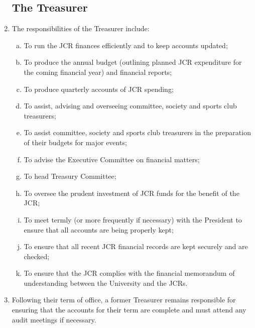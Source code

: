 \documentclass[12pt]{article}  %
\begin{document}
\begin{enumerate}
	\subsection{The Treasurer}
	\item The responsibilities of the Treasurer include:
	\begin{enumerate}[(a)]
		\item To run the JCR finances efficiently and to keep accounts updated;
		\item To produce the annual budget (outlining planned JCR expenditure for the coming financial year) and financial reports;
		\item To produce quarterly accounts of JCR spending;
		\item To assist, advising and overseeing committee, society and sports club treasurers;
		\item To assist committee, society and sports club treasurers in the preparation of their budgets for major events;
		\item To advise the Executive Committee on financial matters;
		\item To head Treasury Committee;
		\item To oversee the prudent investment of JCR funds for the benefit of the JCR;
		\item To meet termly (or more frequently if necessary) with the President to ensure that all accounts are being properly kept;
		\item To ensure that all recent JCR financial records are kept securely and are checked;
		\item To ensure that the JCR complies with the financial memorandum of understanding between the University and the JCRs.
	\end{enumerate}
	\item Following their term of office, a former Treasurer remains responsible for ensuring that the accounts for their term are complete and must attend any audit meetings if necessary.

\end{enumerate}
\end{document}

